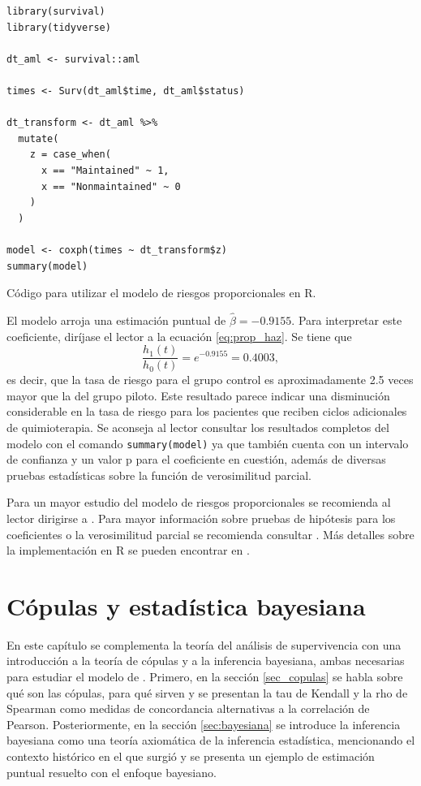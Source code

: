 \documentclass[11pt,a4paper]{article}
\begin{document}
\begin{table}[htb]
\begin{lstlisting}
library(survival)
library(tidyverse)

dt_aml <- survival::aml

times <- Surv(dt_aml$time, dt_aml$status)

dt_transform <- dt_aml %>%
  mutate(
    z = case_when(
      x == "Maintained" ~ 1,
      x == "Nonmaintained" ~ 0
    )
  )

model <- coxph(times ~ dt_transform$z)
summary(model)
\end{lstlisting}
\caption{Código para utilizar el modelo de riesgos proporcionales en R.}
\label{cod:coxph}
\end{table}

\newpage

El modelo arroja una estimación puntual de $\hat{\beta} = -0.9155$. Para interpretar este coeficiente, diríjase el lector a la ecuación \ref{eq:prop_haz}. Se tiene que $$\frac{h_1(t)}{h_0(t)} = e^{-0.9155} = 0.4003,$$ es decir, que la tasa de riesgo para el grupo control es aproximadamente 2.5 veces mayor que la del grupo piloto. Este resultado parece indicar una disminución considerable en la tasa de riesgo para los pacientes que reciben ciclos adicionales de quimioterapia. Se aconseja al lector consultar los resultados completos del modelo con el comando \texttt{summary(model)} ya que también cuenta con un intervalo de confianza y un valor p para el coeficiente en cuestión, además de diversas pruebas estadísticas sobre la función de verosimilitud parcial.

\newpage

Para un mayor estudio del modelo de riesgos proporcionales se recomienda al lector dirigirse a \citet{cox}. Para mayor información sobre pruebas de hipótesis para los coeficientes o la verosimilitud parcial se recomienda consultar \citet{klein}. Más detalles sobre la implementación en R se pueden encontrar en \citet{moore}.

\newpage
\clearpage

\section{Cópulas y estadística bayesiana}

En este capítulo se complementa la teoría del análisis de supervivencia con una introducción a la teoría de cópulas y a la inferencia bayesiana, ambas necesarias para estudiar el modelo de \citet{nieto}. Primero, en la sección \ref{sec_copulas} se habla sobre qué son las cópulas, para qué sirven y se presentan la tau de Kendall y la rho de Spearman como medidas de concordancia alternativas a la correlación de Pearson. Posteriormente, en la sección \ref{sec:bayesiana} se introduce la inferencia bayesiana como una teoría axiomática de la inferencia estadística, mencionando el contexto histórico en el que surgió y se presenta un ejemplo de estimación puntual resuelto con el enfoque bayesiano.
\end{document}
